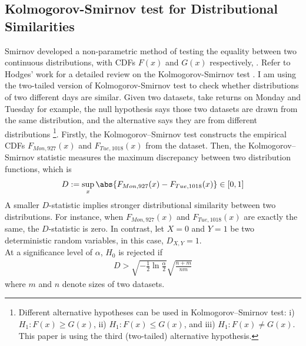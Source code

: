\documentclass[12pt]{article}
\begin{document}
	\subsection{Kolmogorov-Smirnov test for Distributional Similarities}
	\par Smirnov developed a non-parametric method of testing the equality between two continuous distributions, with CDFs $F(x)$ and $G(x)$ respectively, \cite{Smirnov1939}. Refer to Hodges' work for a detailed review on the Kolmogorov-Smirnov test \cite{Hodges1957}. I am using the two-tailed version of Kolmogorov-Smirnov test to check whether distributions of two different days are similar.
	Given two datasets, take returns on Monday and Tuesday for example, the null hypothesis says those two datasets are drawn from the same distribution, and the alternative says they are from different distributions \footnote{Different alternative hypotheses can be used in Kolmogorov–Smirnov test: i) $H_1: F(x) \geq G(x)$, ii) $H_1: F(x) \leq G(x)$, and iii) $H_1: F(x) \neq G(x)$. This paper is using the third (two-tailed) alternative hypothesis.}.
	Firstly, the Kolmogorov–Smirnov test constructs the empirical CDFs $F_{Mon, 927}(x)$ and $F_{Tue, 1018}(x)$ from the dataset. Then, the Kolmogorov–Smirnov statistic measures the maximum discrepancy between two distribution functions, which is
	\begin{align}
		D := \sup_x \abs{F_{Mon, 927}(x) - F_{Tue, 1018}(x)} \in [0, 1]
	\end{align}
	A smaller $D$-statistic implies stronger distributional similarity between two distributions. For instance, when $F_{Mon, 927}(x)$ and $F_{Tue, 1018}(x)$ are exactly the same, the $D$-statistic is zero. In contrast, let $X=0$ and $Y=1$ be two deterministic random variables, in this case, $D_{X, Y} = 1$.\\
	At a significance level of $\alpha$, $H_0$ is rejected if
	\begin{align}
		D > \sqrt{-\frac{1}{2} \ln \frac{\alpha}{2}} \sqrt{\frac{n+m}{nm}}
	\end{align}
	where $m$ and $n$ denote sizes of two datasets.
\end{document}

